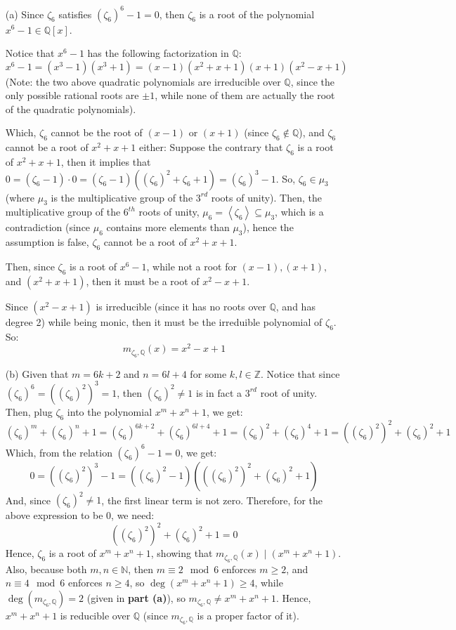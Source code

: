 \documentclass{article}
\begin{document}
\begin{itemize}
    \item[(a)] Since $\zeta_6$ satisfies $(\zeta_6)^6-1 = 0$, then $\zeta_6$ is a root of the polynomial $x^6-1 \in\mathbb{Q}[x]$.
    
    Notice that $x^6-1$ has the following factorization in $\mathbb{Q}$:
    $$x^6-1 = (x^3-1)(x^3+1)=(x-1)(x^2+x+1)(x+1)(x^2-x+1)$$
    (Note: the two above quadratic polynomials are irreducible over $\mathbb{Q}$, since the only possible rational roots are $\pm 1$, while none of them are actually the root of the quadratic polynomials).

    Which, $\zeta_6$ cannot be the root of $(x-1)$ or $(x+1)$ (since $\zeta_6\notin\mathbb{Q}$), and $\zeta_6$ cannot be a root of $x^2+x+1$ either:
    Suppose the contrary that $\zeta_6$ is a root of $x^2+x+1$, then it implies that $0 = (\zeta_6-1)\cdot 0 = (\zeta_6-1)((\zeta_6)^2+\zeta_6+1) = (\zeta_6)^3-1$. So, $\zeta_6 \in \mu_3$ (where $\mu_3$ is the multiplicative group of the $3^{rd}$ roots of unity). Then, the multiplicative group of the $6^{th}$ roots of unity, $\mu_6 = \left<\zeta_6\right> \subseteq \mu_3$, which is a contradiction (since $\mu_6$ contains more elements than $\mu_3$), hence the assumption is false, $\zeta_6$ cannot be a root of $x^2+x+1$.

    Then, since $\zeta_6$ is a root of $x^6-1$, while not a root for $(x-1),(x+1),$ and $(x^2+x+1)$, then it must be a root of $x^2-x+1$.

    Since $(x^2-x+1)$ is irreducible (since it has no roots over $\mathbb{Q}$, and has degree 2) while being monic, then it must be the irreduible polynomial of $\zeta_6$. So:
    $$m_{\zeta_6,\mathbb{Q}}(x) = x^2-x+1$$

    \hfil

    \item[(b)] Given that $m=6k+2$ and $n=6l+4$ for some $k,l\in\mathbb{Z}$. Notice that since $(\zeta_6)^6 = ((\zeta_6)^2)^3 = 1$, then $(\zeta_6)^2\neq 1$ is in fact a $3^{rd}$ root of unity. Then, plug $\zeta_6$ into the polynomial $x^m+x^n+1$, we get:
    $$(\zeta_6)^m+(\zeta_6)^n+1 = (\zeta_6)^{6k+2}+(\zeta_6)^{6l+4}+1 = (\zeta_6)^2 + (\zeta_6)^4 +1 = ((\zeta_6)^2)^2+(\zeta_6)^2+1$$
    Which, from the relation $(\zeta_6)^6-1=0$, we get:
    $$0=((\zeta_6)^2)^3-1 = ((\zeta_6)^2-1)(((\zeta_6)^2)^2+(\zeta_6)^2+1)$$
    And, since $(\zeta_6)^2 \neq 1$, the first linear term is not zero. Therefore, for the above expression to be $0$, we need:
    $$((\zeta_6)^2)^2+(\zeta_6)^2+1 = 0$$
    Hence, $\zeta_6$ is a root of $x^m+x^n+1$, showing that $m_{\zeta_6,\mathbb{Q}}(x)\mid (x^m+x^n+1)$.
    Also, because both $m,n\in\mathbb{N}$, then $m\equiv 2\mod 6$ enforces $m\geq 2$, and $n\equiv 4\mod 6$ enforces $n\geq 4$, so $\deg(x^m+x^n+1)\geq 4$, while $\deg(m_{\zeta_6,\mathbb{Q}}) = 2$ (given in \textbf{part (a)}), so $m_{\zeta_6,\mathbb{Q}}\neq x^m+x^n+1$. Hence, $x^m+x^n+1$ is reducible over $\mathbb{Q}$ (since $m_{\zeta_6,\mathbb{Q}}$ is a proper factor of it).
\end{itemize}
\end{document}
